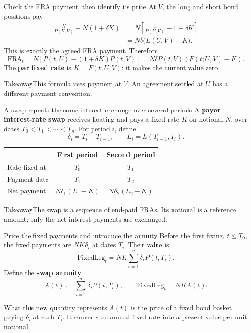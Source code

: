 \documentclass[handout,10pt,t,aspectratio=169]{beamer}
\newenvironment{keybox}{\begin{exampleblock}{Takeaway}}{\end{exampleblock}}
\begin{document}
\begin{frame}{Check the FRA payment, then identify its price}
At \(V\), the long and short bond positions pay
\[
 \begin{aligned}
 \frac{N}{P(U,V)}-N(1+\delta K)
 &=N\left[\frac1{P(U,V)}-1-\delta K\right]\\
 &=N\delta\big(L(U,V)-K\big).
 \end{aligned}
\]
This is exactly the agreed FRA payment. Therefore
\[
 \boxed{\mathrm{FRA}_t
 =N[P(t,U)-(1+\delta K)P(t,V)]
 =N\delta P(t,V)(F(t;U,V)-K).}
\]
The \textbf{par fixed rate} is \(K=F(t;U,V)\): it makes the current value zero.
\begin{keybox}This formula uses payment at \(V\).
An agreement settled at \(U\) has a different payment convention.\end{keybox}
\end{frame}

\begin{frame}{A swap repeats the same interest exchange over several periods}
A \textbf{payer interest-rate swap} receives floating and pays a fixed rate \(K\)
on notional \(N\), over dates \(T_0<T_1<\cdots<T_n\).
For period \(i\), define
\[
 \delta_i=T_i-T_{i-1},\qquad L_i=L(T_{i-1},T_i).
\]
\begin{center}\begin{tabular}{lcc}
\toprule & First period & Second period\\\midrule
Rate fixed at & \(T_0\) & \(T_1\)\\
Payment date & \(T_1\) & \(T_2\)\\
Net payment & \(N\delta_1(L_1-K)\) & \(N\delta_2(L_2-K)\)\\\bottomrule
\end{tabular}\end{center}
\begin{keybox}The swap is a sequence of end-paid FRAs. Its notional is a
reference amount; only the net interest payments are exchanged.\end{keybox}
\end{frame}

\begin{frame}{Price the fixed payments and introduce the annuity}
Before the first fixing, \(t\leq T_0\), the fixed payments are
\(NK\delta_i\) at dates \(T_i\). Their value is
\[
 \mathrm{FixedLeg}_t=NK\sum_{i=1}^n\delta_iP(t,T_i).
\]
Define the \textbf{swap annuity}
\[
 \boxed{A(t):=\sum_{i=1}^n\delta_iP(t,T_i),
 \qquad \mathrm{FixedLeg}_t=NKA(t).}
\]
\begin{block}{What this new quantity represents}
\(A(t)\) is the price of a fixed bond basket paying \(\delta_i\) at each \(T_i\).
It converts an annual fixed rate into a present value per unit notional.
\end{block}
\end{frame}
\end{document}
